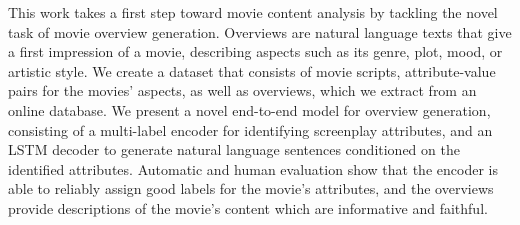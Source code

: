 This work takes a first step toward movie content analysis by tackling the novel task of movie overview generation. Overviews are natural language texts that give a first impression of a movie, describing aspects such as its genre, plot, mood, or artistic style. We create a dataset that consists of movie scripts, attribute-value pairs for the movies' aspects, as well as overviews, which we extract from an online database. We present a novel end-to-end model for overview generation, consisting of a multi-label encoder for identifying screenplay attributes, and an LSTM decoder to generate natural language sentences conditioned on the identified attributes. Automatic and human evaluation show that the encoder is able to reliably assign good labels for the movie's attributes, and the overviews provide descriptions of the movie's content which are informative and faithful.

